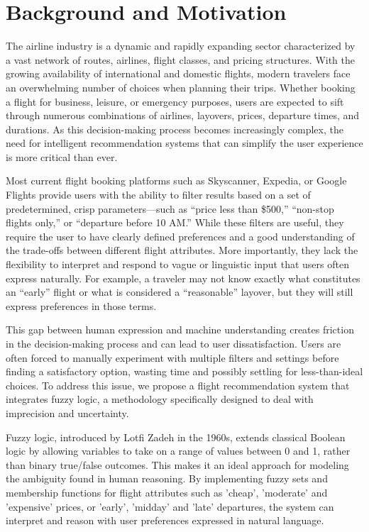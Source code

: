 \documentclass[a4paper]{article}
\begin{document}
\section{Background and Motivation}
The airline industry is a dynamic and rapidly expanding sector characterized by a vast network of routes, airlines, flight classes, and pricing structures. With the growing availability of international and domestic flights, modern travelers face an overwhelming number of choices when planning their trips. Whether booking a flight for business, leisure, or emergency purposes, users are expected to sift through numerous combinations of airlines, layovers, prices, departure times, and durations. As this decision-making process becomes increasingly complex, the need for intelligent recommendation systems that can simplify the user experience is more critical than ever.

Most current flight booking platforms such as Skyscanner, Expedia, or Google Flights provide users with the ability to filter results based on a set of predetermined, crisp parameters---such as ``price less than \$500,'' ``non-stop flights only,'' or ``departure before 10 AM.'' While these filters are useful, they require the user to have clearly defined preferences and a good understanding of the trade-offs between different flight attributes. More importantly, they lack the flexibility to interpret and respond to vague or linguistic input that users often express naturally. For example, a traveler may not know exactly what constitutes an ``early'' flight or what is considered a ``reasonable'' layover, but they will still express preferences in those terms.

This gap between human expression and machine understanding creates friction in the decision-making process and can lead to user dissatisfaction. Users are often forced to manually experiment with multiple filters and settings before finding a satisfactory option, wasting time and possibly settling for less-than-ideal choices. To address this issue, we propose a flight recommendation system that integrates fuzzy logic, a methodology specifically designed to deal with imprecision and uncertainty.

Fuzzy logic, introduced by Lotfi Zadeh in the 1960s, extends classical Boolean logic by allowing variables to take on a range of values between 0 and 1, rather than binary true/false outcomes. This makes it an ideal approach for modeling the ambiguity found in human reasoning. By implementing fuzzy sets and membership functions for flight attributes such as 'cheap', 'moderate' and 'expensive' prices, or 'early', 'midday' and 'late' departures, the system can interpret and reason with user preferences expressed in natural language.
\end{document}
